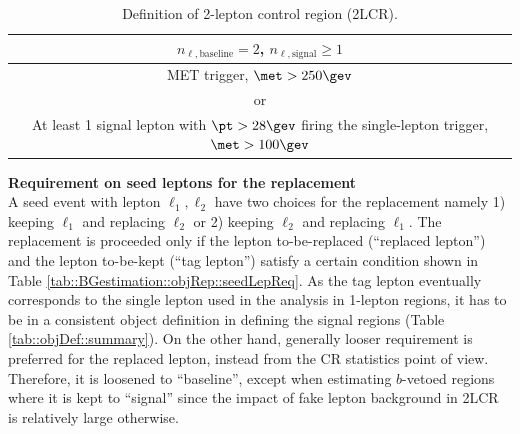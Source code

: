 
\begin{table}[h]
  \begin{center}
    \caption{Definition of 2-lepton control region (2LCR).}
    \begin{tabular}{ c }
      \hline
       $n_{\ell, \mathrm{baseline}}=2$, $n_{\ell, \mathrm{signal}}\ge 1$ \\
      \hline
       MET trigger,  $\met>250\gev$   \\
       or \\
       At least 1 signal lepton with $\pt>28 \gev$ firing the single-lepton trigger, $\met>100\gev$   \\
      \hline
    \end{tabular}  \label{tab::BGestimation::objRep::def2LCR}
  \end{center}
\end{table}



\noindent \textbf{Requirement on seed leptons for the replacement} \\
A seed event with lepton $\ell_1, \ell_2$ have two choices for the replacement namely 1) keeping $\ell_1$ and replacing $\ell_2$ or 2) keeping $\ell_2$ and replacing $\ell_1$. The replacement is proceeded only if the lepton to-be-replaced (``replaced lepton'') and the lepton to-be-kept (``tag lepton'') satisfy a certain condition shown in Table \ref{tab::BGestimation::objRep::seedLepReq}. As the tag lepton eventually corresponds to the single lepton used in the analysis in 1-lepton regions, it has to be in a consistent object definition in defining the signal regions (Table \ref{tab::objDef::summary}). On the other hand, generally looser requirement is preferred for the replaced lepton, instead from the CR statistics point of view. Therefore, it is loosened to ``baseline'',  except when estimating $b$-vetoed regions where it is kept to ``signal'' since  the impact of fake lepton background in 2LCR is relatively large otherwise. \\


